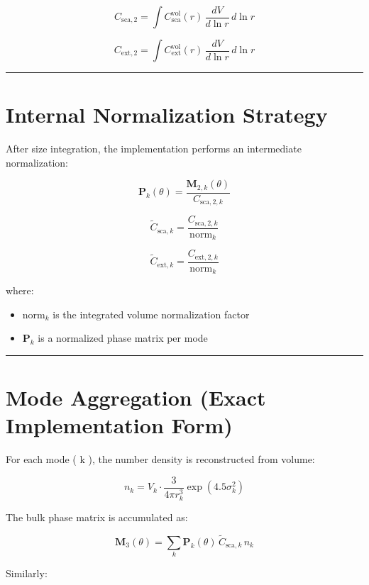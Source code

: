 \documentclass[
  letterpaper,
]{scrbook}
\providecommand{\tightlist}{%
  \setlength{\itemsep}{0pt}\setlength{\parskip}{0pt}}
\begin{document}
\[
C_{\text{sca},2}
=
\int C_{\text{sca}}^{\text{vol}}(r)\,
\frac{dV}{d\ln r}\, d\ln r
\]

\[
C_{\text{ext},2}
=
\int C_{\text{ext}}^{\text{vol}}(r)\,
\frac{dV}{d\ln r}\, d\ln r
\]

\begin{center}\rule{0.5\linewidth}{0.5pt}\end{center}

\section{Internal Normalization
Strategy}\label{internal-normalization-strategy}

After size integration, the implementation performs an intermediate
normalization:

\[
\mathbf{P}_k(\theta) = \frac{\mathbf{M}_{2,k}(\theta)}{C_{\text{sca},2,k}}
\]

\[
\tilde{C}_{\text{sca},k} = \frac{C_{\text{sca},2,k}}{\text{norm}_k}
\]

\[
\tilde{C}_{\text{ext},k} = \frac{C_{\text{ext},2,k}}{\text{norm}_k}
\]

where:

\begin{itemize}
\tightlist
\item
  \(\text{norm}_k\) is the integrated volume normalization factor\\
\item
  \(\mathbf{P}_k\) is a normalized phase matrix per mode
\end{itemize}

\begin{center}\rule{0.5\linewidth}{0.5pt}\end{center}

\section{Mode Aggregation (Exact Implementation
Form)}\label{mode-aggregation-exact-implementation-form}

For each mode ( k ), the number density is reconstructed from volume:

\[
n_k
=
V_k \cdot \frac{3}{4\pi r_k^3} \exp(4.5\sigma_k^2)
\]

The bulk phase matrix is accumulated as:

\[
\mathbf{M}_3(\theta)
=
\sum_k
\mathbf{P}_k(\theta)\,
\tilde{C}_{\text{sca},k}\,
n_k
\]

Similarly:
\end{document}
